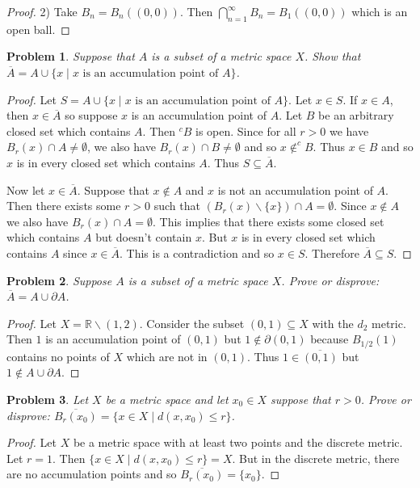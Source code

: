 \documentclass{article}
\newtheorem{problem}{Problem}
\begin{document}
\begin{flushleft}
\begin{proof}
2) Take $B_n = B_n((0,0))$. Then $\bigcap_{n=1}^{\infty} B_n = B_1((0,0))$ which is an open ball.
\end{proof}

\begin{problem}
Suppose that $A$ is a subset of a metric space $X$. Show that $\overline{A} = A \cup \{x \mid \text{$x$ is an accumulation point of $A$}\}$.
\end{problem}
\begin{proof}
Let $S = A \cup \{x \mid \text{$x$ is an accumulation point of $A$}\}$. Let $x \in S$. If $x \in A$, then $x \in \overline{A}$ so suppose $x$ is an accumulation point of $A$. Let $B$ be an arbitrary closed set which contains $A$. Then $^c B$ is open. Since for all $r > 0$ we have $B_r(x) \cap A \neq \emptyset$, we also have $B_r(x) \cap B \neq \emptyset$ and so $x \notin ^c B$. Thus $x \in B$ and so $x$ is in every closed set which contains $A$. Thus $S \subseteq \overline{A}$.\newline

Now let $x \in \overline{A}$. Suppose that $x \notin A$ and $x$ is not an accumulation point of $A$. Then there exists some $r > 0$ such that $(B_r(x) \backslash \{x\}) \cap A = \emptyset$. Since $x \notin A$ we also have $B_r(x) \cap A = \emptyset$. This implies that there exists some closed set which contains $A$ but doesn't contain $x$. But $x$ is in every closed set which contains $A$ since $x \in \overline{A}$. This is a contradiction and so $x \in S$. Therefore $\overline{A} \subseteq S$.
\end{proof}

\begin{problem}
Suppose $A$ is a subset of a metric space $X$. Prove or disprove: $\overline{A} = A \cup \partial A$.
\end{problem}
\begin{proof}
Let $X = \mathbb{R} \backslash (1,2)$. Consider the subset $(0,1) \subseteq X$ with the $d_2$ metric. Then $1$ is an accumulation point of $(0,1)$ but $1 \notin \partial (0,1)$ because $B_{1/2}(1)$ contains no points of $X$ which are not in $(0,1)$. Thus $1 \in \overline{(0,1)}$ but $1 \notin A \cup \partial A$.
\end{proof}

\begin{problem}
Let $X$ be a metric space and let $x_0 \in X$ suppose that $r > 0$. Prove or disprove: $\overline{B_r(x_0)} = \{x \in X \mid d(x, x_0) \leq r\}$.
\end{problem}
\begin{proof}
Let $X$ be a metric space with at least two points and the discrete metric. Let $r = 1$. Then $\{x \in X \mid d(x, x_0) \leq r\} = X$. But in the discrete metric, there are no accumulation points and so $\overline{B_r(x_0)} = \{x_0\}$.
\end{proof}


\end{flushleft}
\end{document}
